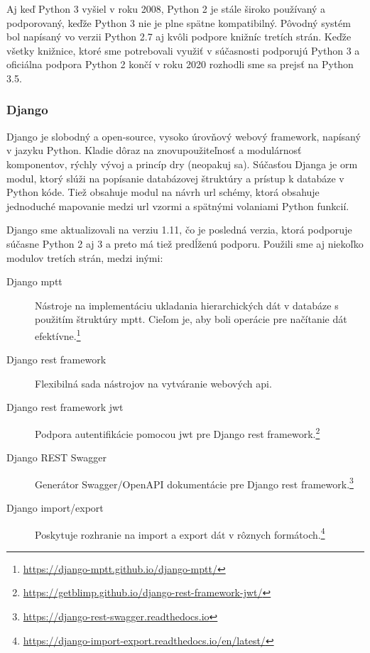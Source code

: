 Aj keď Python 3 vyšiel v roku 2008, Python 2 je stále široko používaný a
podporovaný, keďže Python 3 nie je plne spätne kompatibilný. Pôvodný systém bol
napísaný vo verzii Python 2.7 aj kvôli podpore knižníc tretích strán. Keďže
všetky knižnice, ktoré sme potrebovali využiť v súčasnosti podporujú Python 3 a
oficiálna podpora Python 2 končí v roku 2020 \cite{pep373} rozhodli sme sa
prejsť na Python 3.5.

\subsubsection{Django}
\label{subsubsec:django}

Django je slobodný a open-source, vysoko úrovňový webový framework, napísaný v
jazyku Python. Kladie dôraz na znovupoužiteľnosť a modulárnosť komponentov,
rýchly vývoj a princíp \acrshort{dry} (neopakuj sa). Súčasťou Djanga je
\acrshort{orm} modul, ktorý slúži na popísanie databázovej štruktúry a prístup k
databáze v Python kóde. Tiež obsahuje modul na návrh \acrshort{url} schémy,
ktorá obsahuje jednoduché mapovanie medzi \acrshort{url} vzormi a spätnými
volaniami Python funkcií. \cite{django}

Django sme aktualizovali na verziu 1.11, čo je posledná verzia, ktorá podporuje
súčasne Python 2 aj 3 a preto má tiež predĺženú podporu. Použili sme aj niekoľko
modulov tretích strán, medzi inými:

\begin{description}
\item[Django \acrshort{mptt}] Nástroje na implementáciu ukladania hierarchických
  dát v databáze s použitím štruktúry \acrfull{mptt}. Cieľom je, aby boli
  operácie pre načítanie dát
  efektívne.\footnote{\url{https://django-mptt.github.io/django-mptt/}}
\item[Django \acrshort{rest} framework] Flexibilná sada nástrojov na vytváranie
  webových \acrshort{api}. \cite{django_rest_framework}
\item[Django \acrshort{rest} framework \acrshort{jwt}] Podpora autentifikácie
  pomocou \acrshort{jwt} pre Django \acrshort{rest}
  framework.\footnote{\url{https://getblimp.github.io/django-rest-framework-jwt/}}
\item[Django REST Swagger] Generátor Swagger/OpenAPI dokumentácie pre Django
  \acrshort{rest}
  framework.\footnote{\url{https://django-rest-swagger.readthedocs.io}}
\item[Django import/export] Poskytuje rozhranie na import a export dát v rôznych
  formátoch.\footnote{\url{https://django-import-export.readthedocs.io/en/latest/}}
\end{description}

